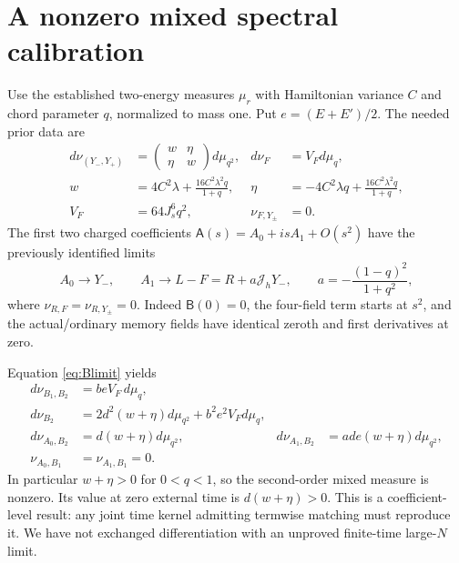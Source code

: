 \documentclass[11pt,a4paper]{article}
\newcommand{\MA}{\mathsf A}
\newcommand{\BB}{\mathsf B}
\newcommand{\Jh}{\mathcal J_h}
\begin{document}
\section{A nonzero mixed spectral calibration}
Use the established two-energy measures $\mu_r$ with Hamiltonian
variance $C$ and chord parameter $q$, normalized to mass one.
Put $e=(E+E')/2$. The needed prior data \cite{Central,Mixed} are
\begin{align}
 d\nu_{(Y_-,Y_+)}&=
 \begin{pmatrix}w&\eta\\\eta&w\end{pmatrix}d\mu_{q^2},
 &d\nu_F&=V_Fd\mu_q,\\
 w&=4C^2\lambda+\frac{16C^2\lambda^2q}{1+q},
 &\eta&=-4C^2\lambda q+\frac{16C^2\lambda^2q}{1+q},\\
 V_F&=64J_s^6q^2,&\nu_{F,Y_\pm}&=0.
\end{align}
The first two charged coefficients $\MA(s)=A_0+isA_1+O(s^2)$
have the previously identified limits
\begin{equation}
 A_0\to Y_-,\qquad A_1\to L-F=R+a\Jh Y_-,\qquad
 a=-\frac{(1-q)^2}{1+q^2},
\end{equation}
where $\nu_{R,F}=\nu_{R,Y_\pm}=0$. Indeed $\BB(0)=0$, the
four-field term starts at $s^2$, and the actual/ordinary memory
fields have identical zeroth and first derivatives at zero.

Equation \eqref{eq:Blimit} yields
\begin{align}
 d\nu_{B_1,B_2}&=b e V_F\,d\mu_q,\\
 d\nu_{B_2}&=2d^2(w+\eta)d\mu_{q^2}+b^2e^2V_Fd\mu_q,\\
 d\nu_{A_0,B_2}&=d(w+\eta)d\mu_{q^2},&
 d\nu_{A_1,B_2}&=ad e(w+\eta)d\mu_{q^2},\\
 \nu_{A_0,B_1}&=\nu_{A_1,B_1}=0.
\end{align}
In particular $w+\eta>0$ for $0<q<1$, so the second-order mixed
measure is nonzero. Its value at zero external time is
$d(w+\eta)>0$. This is a coefficient-level result: any joint
time kernel admitting termwise matching must reproduce it.
We have not exchanged differentiation with an unproved
finite-time large-$N$ limit.
\end{document}

